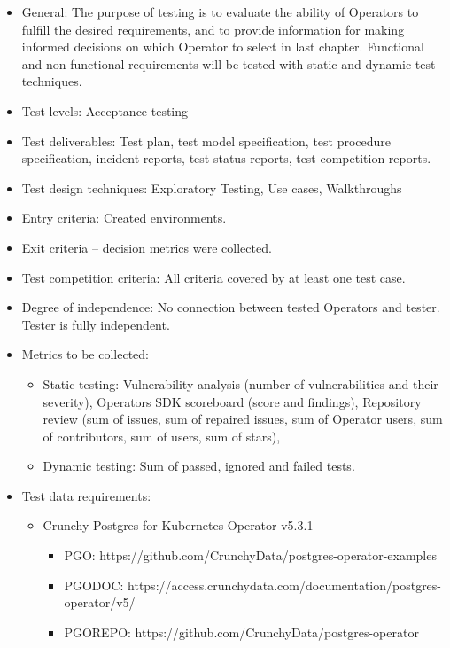 \begin{itemize}
        \begin{itemize}
          \item General: The purpose of testing is to evaluate the ability of Operators to fulfill the desired requirements, and to provide information for making informed decisions on which Operator to select in last chapter. Functional and non-functional requirements will be tested with static and dynamic test techniques.
          \item Test levels: Acceptance testing
          \item Test deliverables: Test plan, test model specification, test procedure specification, incident reports, test status reports, test competition reports.
          \item Test design techniques: Exploratory Testing, Use cases, Walkthroughs
          \item Entry criteria: Created environments.
          \item Exit criteria – decision metrics were collected.
          \item Test competition criteria: All criteria covered by at least one test case.
          \item Degree of independence: No connection between tested Operators and tester. Tester is fully independent.
          \item Metrics to be collected:
                \begin{itemize}
                  \item Static testing: Vulnerability analysis (number of vulnerabilities and their severity), Operators SDK scoreboard (score and findings), Repository review (sum of issues, sum of repaired issues, sum of Operator users, sum of contributors, sum of users, sum of stars),
                  \item Dynamic testing:  Sum of passed, ignored and failed tests.
                \end{itemize}
          \item Test data requirements:
                \begin{itemize}
                  \item Crunchy Postgres for Kubernetes Operator v5.3.1
                        \begin{itemize}
                          \item PGO: https://github.com/CrunchyData/postgres-operator-examples
                          \item PGODOC: https://access.crunchydata.com/documentation/postgres-operator/v5/
                          \item PGOREPO: https://github.com/CrunchyData/postgres-operator
                        \end{itemize}


\end{itemize}
\end{itemize}
\end{itemize}
